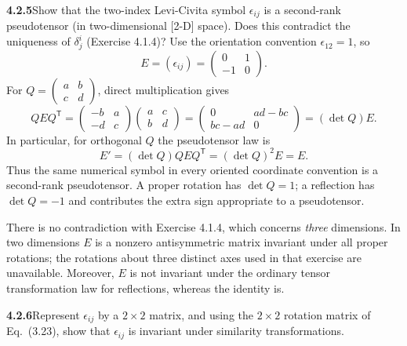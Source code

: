 \par\bigskip
\noindent\textbf{4.2.5}\quad Show that the two-index Levi-Civita symbol
$\epsilon_{ij}$ is a second-rank pseudotensor (in two-dimensional [2-D]
space). Does this contradict the uniqueness of $\delta_{j}^{i}$
(Exercise 4.1.4)?
\solution
Use the orientation convention $\epsilon_{12}=1$, so
\[
E=(\epsilon_{ij})=\begin{pmatrix}0&1\\-1&0\end{pmatrix}.
\]
For $Q=\begin{pmatrix}a&b\\c&d\end{pmatrix}$, direct multiplication gives
\[
QEQ^{\mathsf T}
=\begin{pmatrix}-b&a\\-d&c\end{pmatrix}
 \begin{pmatrix}a&c\\b&d\end{pmatrix}
=\begin{pmatrix}0&ad-bc\\bc-ad&0\end{pmatrix}
=(\det Q)E.
\]
In particular, for orthogonal $Q$ the pseudotensor law is
\[
E'=(\det Q)QEQ^{\mathsf T}=(\det Q)^2E=E.
\]
Thus the same numerical symbol in every oriented coordinate convention
is a second-rank pseudotensor. A proper rotation has $\det Q=1$; a
reflection has $\det Q=-1$ and contributes the extra sign appropriate
to a pseudotensor.

There is no contradiction with Exercise 4.1.4, which concerns
\emph{three} dimensions. In two dimensions $E$ is a nonzero
antisymmetric matrix invariant under all proper rotations; the rotations
about three distinct axes used in that exercise are unavailable.
Moreover, $E$ is not invariant under the ordinary tensor transformation
law for reflections, whereas the identity is.

\par\bigskip
\noindent\textbf{4.2.6}\quad Represent $\epsilon_{ij}$ by a $2\times2$ matrix,
and using the $2\times2$ rotation matrix of Eq.~(3.23), show that
$\epsilon_{ij}$ is invariant under  similarity transformations.
\solution
{}

